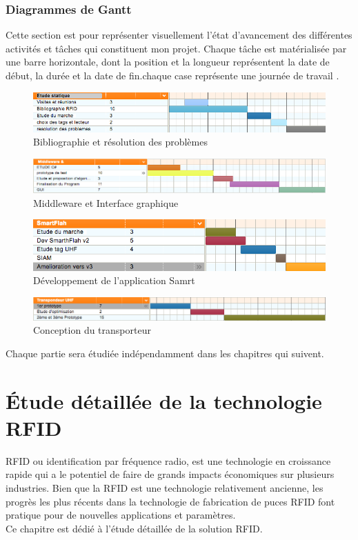 \documentclass[11pt, a4paper, twoside]{book}
\begin{document}
\subsection{Diagrammes	de	Gantt}
Cette section est pour représenter visuellement l'état d'avancement des différentes activités et tâches qui constituent mon projet. Chaque tâche est matérialisée par une barre horizontale, dont la position et la longueur représentent la date de début, la durée et la date de fin.chaque case représente une journée de travail . 
\begin{figure}[H]
\centering
\includegraphics[width=\textwidth]{etudestatic}
\caption{Bibliographie et résolution des problèmes}

\end{figure}
\begin{figure}[H]
\centering
\includegraphics[width=\textwidth]{mid}
\caption{Middleware et Interface graphique}

\end{figure}
\begin{figure}[H]
\centering
\includegraphics[width=\textwidth]{smart}
\caption{Développement de l'application Samrt}

\end{figure}
\begin{figure}[H]
\centering
\includegraphics[width=\textwidth]{trans}
\caption{Conception du transporteur}

\end{figure}


Chaque partie sera étudiée indépendamment dans les chapitres qui suivent.

\chapter{Étude	détaillée de la technologie RFID}
RFID ou identification par fréquence radio, est une technologie en croissance rapide qui a le potentiel de faire de grands impacts économiques sur plusieurs industries. Bien que la RFID est une technologie relativement ancienne, les progrès les plus récents dans la technologie de fabrication de puces RFID font pratique pour de nouvelles applications et paramètres.\\
Ce chapitre est dédié à l'étude	 détaillée de la solution RFID.
\end{document}
